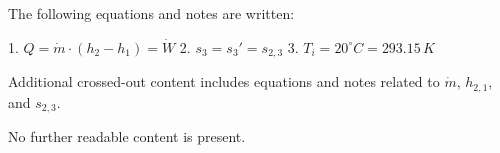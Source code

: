 The following equations and notes are written:  

1. \( Q = \dot{m} \cdot (h_2 - h_1) = \dot{W} \)  
2. \( s_3 = s_3' = s_{2,3} \)  
3. \( T_i = 20^\circ C = 293.15 \, K \)  

Additional crossed-out content includes equations and notes related to \( \dot{m} \), \( h_{2,1} \), and \( s_{2,3} \).  

No further readable content is present.